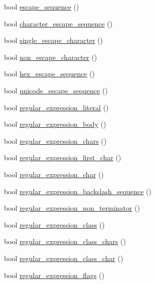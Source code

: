 \begin{DoxyCompactItemize}
\item 
bool \hyperlink{class_lexical_grammar_aba86d71a98d0bf2f7ad78e22b1c906f0}{escape\+\_\+sequence} ()
\item 
bool \hyperlink{class_lexical_grammar_abf0678a4b3e6cf81cfb7e87fdc88a1ab}{character\+\_\+escape\+\_\+sequence} ()
\item 
bool \hyperlink{class_lexical_grammar_a5ef26a3dd4d2c39ba5016675d3afa8dd}{single\+\_\+escape\+\_\+character} ()
\item 
bool \hyperlink{class_lexical_grammar_a6c3dc0efec370cfadc61e11ae53af449}{non\+\_\+escape\+\_\+character} ()
\item 
bool \hyperlink{class_lexical_grammar_a76722915a4ae4e864ffd7c750da8c9aa}{hex\+\_\+escape\+\_\+sequence} ()
\item 
bool \hyperlink{class_lexical_grammar_a411dd476c213ddb338a80766596d0d74}{unicode\+\_\+escape\+\_\+sequence} ()
\item 
bool \hyperlink{class_lexical_grammar_a86df93444a68819148ce938342342b84}{regular\+\_\+expression\+\_\+literal} ()
\item 
bool \hyperlink{class_lexical_grammar_ac4fed727bab8e01ddef683e8638f3975}{regular\+\_\+expression\+\_\+body} ()
\item 
bool \hyperlink{class_lexical_grammar_a21d16ea0d1b6b26e45da2e0af6149fbc}{regular\+\_\+expression\+\_\+chars} ()
\item 
bool \hyperlink{class_lexical_grammar_afc3a2aeab485760400e58836e00c3d70}{regular\+\_\+expression\+\_\+first\+\_\+char} ()
\item 
bool \hyperlink{class_lexical_grammar_ad48826aa5f41c65db545c80f791251b2}{regular\+\_\+expression\+\_\+char} ()
\item 
bool \hyperlink{class_lexical_grammar_ab25a92427eff914c4a1b01cd15cae9c5}{regular\+\_\+expression\+\_\+backslash\+\_\+sequence} ()
\item 
bool \hyperlink{class_lexical_grammar_a759b85cb75cdfbad63325a40d117b5ad}{regular\+\_\+expression\+\_\+non\+\_\+terminator} ()
\item 
bool \hyperlink{class_lexical_grammar_a4ea2fac37d3c75b080966f3dc0fb9fe4}{regular\+\_\+expression\+\_\+class} ()
\item 
bool \hyperlink{class_lexical_grammar_a77f711dd4ef77b6ab36222ec0914ef8c}{regular\+\_\+expression\+\_\+class\+\_\+chars} ()
\item 
bool \hyperlink{class_lexical_grammar_a13f847b3be28cea576bf29ad7d779c48}{regular\+\_\+expression\+\_\+class\+\_\+char} ()
\item 
bool \hyperlink{class_lexical_grammar_adf9549c929bfd16abf7b7b880c9ee3cf}{regular\+\_\+expression\+\_\+flags} ()
\end{DoxyCompactItemize}
